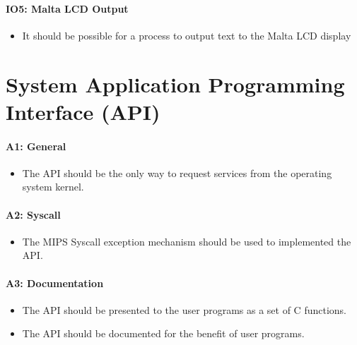 \paragraph*{IO5: Malta LCD Output}
\label{pg:io5}

\begin{itemize}
  \item It should be possible for a process to output text to the Malta LCD display
\end{itemize}

\section{System Application Programming Interface (API)}

\paragraph*{A1: General}
\label{pg:a1}

\begin{itemize}
  \item The API should be the only way to request services from the operating system kernel.
\end{itemize}

\paragraph*{A2: Syscall}

\begin{itemize}
  \item The MIPS Syscall exception mechanism should be used to implemented the API.
\end{itemize}

\paragraph*{A3: Documentation}

\begin{itemize}
  \item The API should be presented to the user programs as a set of C functions.
  \item  The API should be documented for the benefit of user programs.
\end{itemize}

